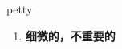 
\begin{frame}
{\huge petty}
\begin{center}
\begin{enumerate}\Large
  \item \textbf{细微的，不重要的}
\end{enumerate}
\end{center}
\end{frame}
